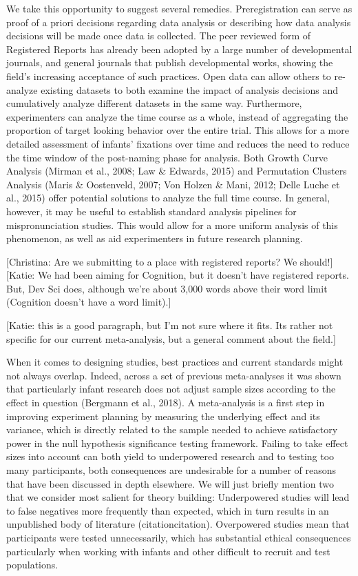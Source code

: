 \documentclass[man]{apa6}
\theoremstyle{definition}
\theoremstyle{definition}
\theoremstyle{definition}
\theoremstyle{remark}
\begin{document}
We take this opportunity to suggest several remedies. Preregistration
can serve as proof of a priori decisions regarding data analysis or
describing how data analysis decisions will be made once data is
collected. The peer reviewed form of Registered Reports has already been
adopted by a large number of developmental journals, and general
journals that publish developmental works, showing the field's
increasing acceptance of such practices. Open data can allow others to
re-analyze existing datasets to both examine the impact of analysis
decisions and cumulatively analyze different datasets in the same way.
Furthermore, experimenters can analyze the time course as a whole,
instead of aggregating the proportion of target looking behavior over
the entire trial. This allows for a more detailed assessment of infants'
fixations over time and reduces the need to reduce the time window of
the post-naming phase for analysis. Both Growth Curve Analysis (Mirman
et al., 2008; Law \& Edwards, 2015) and Permutation Clusters Analysis
(Maris \& Oostenveld, 2007; Von Holzen \& Mani, 2012; Delle Luche et
al., 2015) offer potential solutions to analyze the full time course. In
general, however, it may be useful to establish standard analysis
pipelines for mispronunciation studies. This would allow for a more
uniform analysis of this phenomenon, as well as aid experimenters in
future research planning.

{[}Christina: Are we submitting to a place with registered reports? We
should!{]}{[}Katie: We had been aiming for Cognition, but it doesn't
have registered reports. But, Dev Sci does, although we're about 3,000
words above their word limit (Cognition doesn't have a word limit).{]}

{[}Katie: this is a good paragraph, but I'm not sure where it fits. Its
rather not specific for our current meta-analysis, but a general comment
about the field.{]}

When it comes to designing studies, best practices and current standards
might not always overlap. Indeed, across a set of previous meta-analyses
it was shown that particularly infant research does not adjust sample
sizes according to the effect in question (Bergmann et al., 2018). A
meta-analysis is a first step in improving experiment planning by
measuring the underlying effect and its variance, which is directly
related to the sample needed to achieve satisfactory power in the null
hypothesis significance testing framework. Failing to take effect sizes
into account can both yield to underpowered research and to testing too
many participants, both consequences are undesirable for a number of
reasons that have been discussed in depth elsewhere. We will just
briefly mention two that we consider most salient for theory building:
Underpowered studies will lead to false negatives more frequently than
expected, which in turn results in an unpublished body of literature
(citationcitation). Overpowered studies mean that participants were
tested unnecessarily, which has substantial ethical consequences
particularly when working with infants and other difficult to recruit
and test populations.
\end{document}
